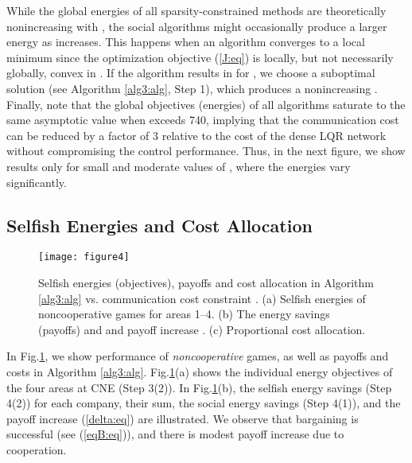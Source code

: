 \documentclass[12pt, draftclsnofoot,onecolumn]{IEEEtran}
\newcommand{\figfourwidth}{3.5in}
\newcommand{\figfourwidth}{4in}
\begin{document}
While the global energies of all sparsity-constrained methods are theoretically nonincreasing with , the social algorithms might occasionally produce a larger energy as  increases. This happens when an algorithm converges to a local minimum since the optimization objective (\ref{J:eq}) is locally, but not necessarily globally, convex in  \cite{rautert1997computational}. If the algorithm results in  for , we choose a suboptimal solution  (see Algorithm \ref{alg3:alg}, Step 1), which produces a nonincreasing . Finally, note that the global objectives (energies) of all algorithms saturate to the same asymptotic value when  exceeds 740, implying that the communication cost can be reduced by a factor of 3 relative to the cost of the dense LQR network without compromising the control performance. Thus, in the next figure, we show results only for small and moderate values of , where the energies vary significantly.


\subsection{Selfish Energies and Cost Allocation}
\label{cost_alloc:sec}

\begin{figure}[!t]
\centering 
\texttt{[image: figure4]}
\caption{Selfish energies (objectives), payoffs and cost allocation in Algorithm \ref{alg3:alg} vs. communication cost constraint . (a) Selfish energies of noncooperative games for areas 1--4. (b) The energy savings (payoffs)  and  and payoff increase . (c) Proportional cost allocation.}
\label{payoff:fig}
\end{figure}

In Fig.\ref{payoff:fig}, we show performance of {\it noncooperative} games, as well as payoffs and costs in Algorithm \ref{alg3:alg}. Fig.\ref{payoff:fig}(a) shows the individual energy objectives of the four areas at CNE (Step 3(2)). In Fig.\ref{payoff:fig}(b), the selfish energy savings  (Step 4(2)) for each company, their sum, the social energy savings  (Step 4(1)), and the payoff increase  (\ref{delta:eq}) are illustrated. We observe that bargaining is successful (see (\ref{eqB:eq})), and there is modest payoff increase due to cooperation. 
\end{document}
